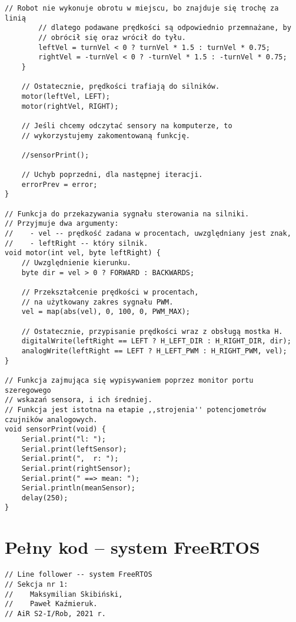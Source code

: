 \documentclass[11pt]{article}
\begin{document}
\begin{appendices}
\begin{lstlisting}[basicstyle = \ttfamily \footnotesize]
        // Robot nie wykonuje obrotu w miejscu, bo znajduje się trochę za linią
        // dlatego podawane prędkości są odpowiednio przemnażane, by
        // obrócił się oraz wrócił do tyłu.
        leftVel = turnVel < 0 ? turnVel * 1.5 : turnVel * 0.75;
        rightVel = -turnVel < 0 ? -turnVel * 1.5 : -turnVel * 0.75;        
    }

    // Ostatecznie, prędkości trafiają do silników.
    motor(leftVel, LEFT);
    motor(rightVel, RIGHT);    

    // Jeśli chcemy odczytać sensory na komputerze, to
    // wykorzystujemy zakomentowaną funkcję.
    
    //sensorPrint();

    // Uchyb poprzedni, dla następnej iteracji.
    errorPrev = error;
}

// Funkcja do przekazywania sygnału sterowania na silniki.
// Przyjmuje dwa argumenty:
//    - vel -- prędkość zadana w procentach, uwzględniany jest znak,
//    - leftRight -- który silnik.
void motor(int vel, byte leftRight) {
    // Uwzględnienie kierunku.
    byte dir = vel > 0 ? FORWARD : BACKWARDS;

    // Przekształcenie prędkości w procentach,
    // na użytkowany zakres sygnału PWM.
    vel = map(abs(vel), 0, 100, 0, PWM_MAX);

    // Ostatecznie, przypisanie prędkości wraz z obsługą mostka H.
    digitalWrite(leftRight == LEFT ? H_LEFT_DIR : H_RIGHT_DIR, dir);
    analogWrite(leftRight == LEFT ? H_LEFT_PWM : H_RIGHT_PWM, vel);
}

// Funkcja zajmująca się wypisywaniem poprzez monitor portu szeregowego
// wskazań sensora, i ich średniej.
// Funkcja jest istotna na etapie ,,strojenia'' potencjometrów czujników analogowych.
void sensorPrint(void) {
    Serial.print("l: ");
    Serial.print(leftSensor);
    Serial.print(",  r: ");
    Serial.print(rightSensor);
    Serial.print(" ==> mean: ");
    Serial.println(meanSensor);
    delay(250);
}
\end{lstlisting}

\newpage



\section{Pełny kod -- system FreeRTOS \label{sec:kodRtos}}

\begin{lstlisting}[basicstyle = \ttfamily \footnotesize]
// Line follower -- system FreeRTOS
// Sekcja nr 1:
//    Maksymilian Skibiński,
//    Paweł Kaźmieruk.
// AiR S2-I/Rob, 2021 r.


\end{lstlisting}
\end{appendices}
\end{document}
